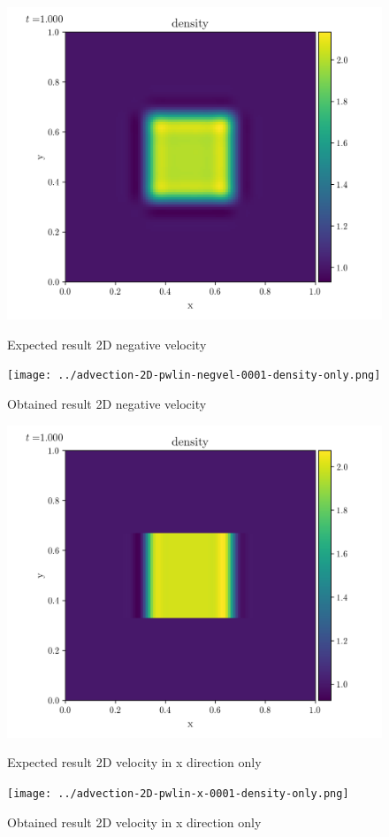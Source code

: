 \begin{figure}[htbp]
    \centering
	\includegraphics[width=.7\textwidth]{./figures/advection-2D-pwlin-negvel-0001-density-only.png}%
	\caption{Expected result 2D negative velocity}
	\texttt{[image: ../advection-2D-pwlin-negvel-0001-density-only.png]}%
	\caption{Obtained result 2D negative velocity}
\end{figure}

\begin{figure}[htbp]
    \centering
	\includegraphics[width=.7\textwidth]{./figures/advection-2D-pwlin-x-0001-density-only.png}%
	\caption{Expected result 2D velocity in x direction only}
	\texttt{[image: ../advection-2D-pwlin-x-0001-density-only.png]}%
	\caption{Obtained result 2D velocity in x direction only}
\end{figure}

